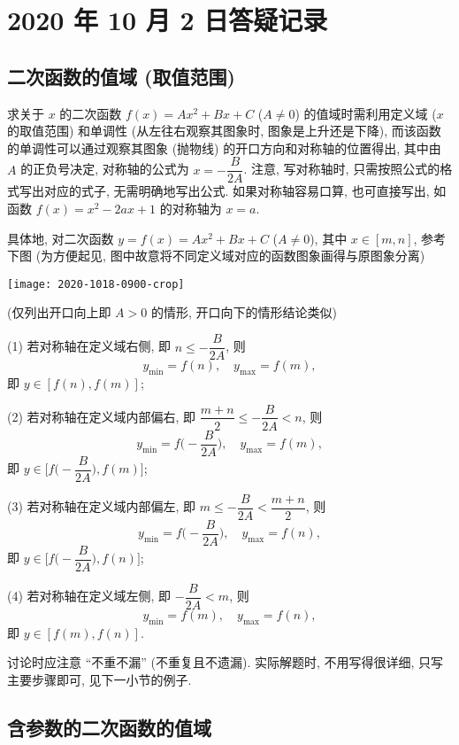 \section{2020 年 10 月 2 日答疑记录}

\subsection{二次函数的值域 (取值范围)}

求关于 $x$ 的二次函数 $f(x)= Ax^2+Bx+C$ ($A\neq 0$) 的值域时需利用定义域 ($x$ 的取值范围) 和单调性 (从左往右观察其图象时, 图象是上升还是下降), 而该函数的单调性可以通过观察其图象 (抛物线) 的开口方向和对称轴的位置得出, 其中由 $A$ 的正负号决定, 对称轴的公式为 $x= -\dfrac{B}{2A}$. 注意, 写对称轴时, 只需按照公式的格式写出对应的式子, 无需明确地写出公式. 如果对称轴容易口算, 也可直接写出, 如函数 $f(x)= x^2-2ax+1$ 的对称轴为 $x= a$.

具体地, 对二次函数 $y=f(x)= Ax^2+Bx+C$ ($A\neq 0$), 其中 $x\in[m,n]$, 参考下图 (为方便起见, 图中故意将不同定义域对应的函数图象画得与原图象分离)
 
  \begin{center}
  \texttt{[image: 2020-1018-0900-crop]}
  \end{center}

(仅列出开口向上即 $A>0$ 的情形, 开口向下的情形结论类似)

(1) 若对称轴在定义域右侧, 即 $n\leqslant -\dfrac{B}{2A}$, 则
\[y_{\min}=f(n),\quad y_{\max}=f(m),\]
即 $y\in[f(n), f(m)]$;
  
(2) 若对称轴在定义域内部偏右, 即 $\dfrac{m+n}2\leqslant -\dfrac{B}{2A}< n$, 则
\[y_{\min}=f\biggl(-\dfrac{B}{2A}\biggr),\quad y_{\max}=f(m),\]
即 $y\in\biggl[f\biggl(-\dfrac{B}{2A}\biggr), f(m)\biggr]$;

(3) 若对称轴在定义域内部偏左, 即 $m\leqslant -\dfrac{B}{2A}< \dfrac{m+n}2$, 则
\[y_{\min}=f\biggl(-\dfrac{B}{2A}\biggr),\quad y_{\max}=f(n),\]
即 $y\in\biggl[f\biggl(-\dfrac{B}{2A}\biggr), f(n)\biggr]$;

(4) 若对称轴在定义域左侧, 即 $-\dfrac{B}{2A}<m$, 则
\[y_{\min}=f(m),\quad y_{\max}=f(n),\]
即 $y\in[f(m), f(n)]$.

讨论时应注意 ``不重不漏'' (不重复且不遗漏). 实际解题时, 不用写得很详细, 只写主要步骤即可, 见下一小节的例子.

\subsection{含参数的二次函数的值域}

